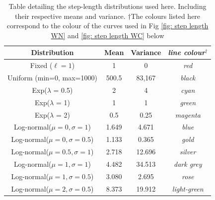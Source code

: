 \documentclass[english]{article}
\begin{document}
\begin{appendices}
\begin{table}[h]
\centering
\begin{tabular}{|c|c|c|c|}
\hline
\textbf{Distribution}             & \textbf{Mean} & \textbf{Variance} & \textit{line colour}$^\dagger$\\ \hline
Fixed ($\ell=1$) & 1             & 0              & \textit{red}  \\ \hline
Uniform (min=0, max=1000)        & 500.5         & 83,167        &  \textit{black}   \\ \hline
Exp($\lambda$ = 0.5)              & 2             & 4       &   \textit{cyan}        \\ \hline
Exp($\lambda$ = 1)                & 1             & 1        & \textit{green}         \\ \hline
Exp($\lambda$ = 2)                & 0.5           & 0.25     &     \textit{magenta}     \\ \hline
Log-normal($\mu=0, \sigma=1$)     & 1.649         & 4.671     & \textit{blue}        \\ \hline
Log-normal($\mu=0, \sigma=0.5$)   & 1.133         & 0.365      & \textit{gold}       \\ \hline
Log-normal($\mu=0.5, \sigma=1$)   & 2.718         & 12.696     & \textit{silver}       \\ \hline
Log-normal($\mu=1, \sigma=1$)     & 4.482         & 34.513     & \textit{dark grey}       \\ \hline
Log-normal($\mu=1, \sigma=0.5$)   & 3.080         & 2.695     & \textit{rose}        \\ \hline
Log-normal($\mu=2, \sigma=0.5$)   & 8.373         & 19.912     & \textit{light-green}       \\ \hline
\end{tabular}
\caption{Table detailing the step-length distributions used here. Including their respective means and variance. $\dagger$The colours listed here correspond to the colour of the curves used in Fig \ref{fig: step length WN} and \ref{fig: step length WC} below}
\label{Table: step-lengths}
\end{table}




\end{appendices}
\end{document}
